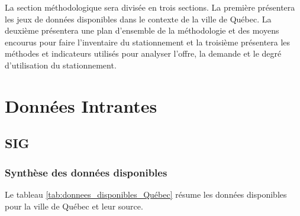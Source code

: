 \label{sec:Methodologie}
La section méthodologique sera divisée en trois sections. La première présentera les jeux de données disponibles dans le contexte de la ville de Québec. La deuxième présentera une plan d'ensemble de la méthodologie et des moyens encourus pour faire l'inventaire du stationnement et la troisième présentera les méthodes et indicateurs utilisés pour analyser l'offre, la demande et le degré d'utilisation du stationnement.
\section{Données Intrantes}
  \subsection{\ac{SIG}}
    \subsubsection{Synthèse des données disponibles}
      Le tableau \ref{tab:donnees_disponibles_Québec} résume les données disponibles pour la ville de Québec et leur source.
